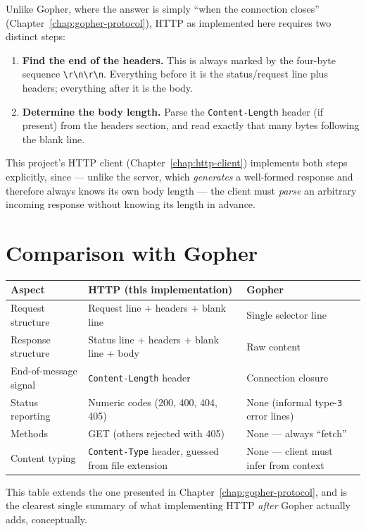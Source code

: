 Unlike Gopher, where the answer is simply ``when the connection closes'' (Chapter~\ref{chap:gopher-protocol}), HTTP as implemented here requires two distinct steps:

\begin{enumerate}
    \item \textbf{Find the end of the headers.} This is always marked by the four-byte sequence \texttt{\textbackslash r\textbackslash n\textbackslash r\textbackslash n}. Everything before it is the status/request line plus headers; everything after it is the body.
    \item \textbf{Determine the body length.} Parse the \texttt{Content-Length} header (if present) from the headers section, and read exactly that many bytes following the blank line.
\end{enumerate}

This project's HTTP client (Chapter~\ref{chap:http-client}) implements both steps explicitly, since --- unlike the server, which \emph{generates} a well-formed response and therefore always knows its own body length --- the client must \emph{parse} an arbitrary incoming response without knowing its length in advance.

\section{Comparison with Gopher}

\begin{center}
\begin{tabularx}{\textwidth}{l X X}
\toprule
\textbf{Aspect} & \textbf{HTTP (this implementation)} & \textbf{Gopher} \\
\midrule
Request structure & Request line + headers + blank line & Single selector line \\
Response structure & Status line + headers + blank line + body & Raw content \\
End-of-message signal & \texttt{Content-Length} header & Connection closure \\
Status reporting & Numeric codes (200, 400, 404, 405) & None (informal type-\texttt{3} error lines) \\
Methods & GET (others rejected with 405) & None --- always ``fetch'' \\
Content typing & \texttt{Content-Type} header, guessed from file extension & None --- client must infer from context \\
\bottomrule
\end{tabularx}
\end{center}

This table extends the one presented in Chapter~\ref{chap:gopher-protocol}, and is the clearest single summary of what implementing HTTP \emph{after} Gopher actually adds, conceptually.
